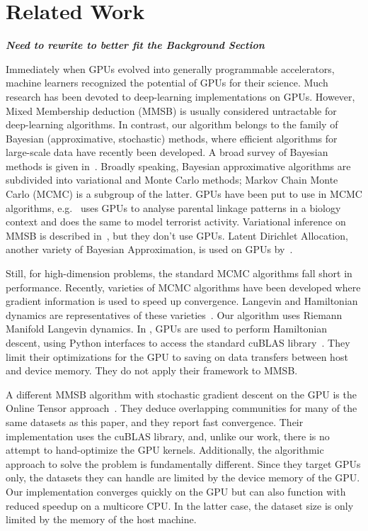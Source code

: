 \section{Related Work}
\label{sec-related}

\textbf{\textit{\large Need to rewrite to better fit the Background Section}}

Immediately when GPUs evolved into generally programmable accelerators, machine
learners recognized the potential of GPUs for their science.
Much research
has been devoted to deep-learning implementations on GPUs. However, Mixed
Membership deduction (MMSB) is usually considered untractable for deep-learning
algorithms. In contrast, our algorithm belongs to the family of Bayesian
(approximative, stochastic) methods, where efficient algorithms for large-scale
data have recently been developed. A broad survey of Bayesian methods is given
in~\cite{DBLP:journals/corr/Zhu0H14}. Broadly speaking, Bayesian approximative
algorithms are subdivided into variational and Monte Carlo methods; Markov
Chain Monte Carlo (MCMC) is a subgroup of the latter. GPUs have been put to
use in MCMC algorithms, e.g.\ \cite{journals/bioinformatics/MedlarGSBK13}
uses GPUs to analyse parental linkage patterns in a biology context and
\cite{DBLP:journals/csda/WhiteP14} does the same to model terrorist activity.
Variational inference on MMSB is described
in~\cite{DBLP:conf/nips/GopalanMGFB12}, but they don't use GPUs. Latent
Dirichlet Allocation, another variety of Bayesian Approximation, is used on
GPUs by~\cite{DBLP:conf/nips/YanXQ09}.

Still, for high-dimension problems, the standard MCMC algorithms fall short in
performance. Recently, varieties of MCMC algorithms have been developed where
gradient information is used to speed up convergence. Langevin and Hamiltonian
dynamics are representatives of these
varieties~\cite{Girolami_riemannmanifold}.  Our algorithm uses Riemann Manifold
Langevin dynamics. In \cite{beam2014fast}, GPUs are used to perform Hamiltonian
descent, using Python interfaces to access the standard cuBLAS
library~\cite{cuBLAS}. They limit their optimizations for the GPU to
saving on data transfers between host and device memory. They do not apply
their framework to MMSB.

A different MMSB algorithm with stochastic gradient descent on the GPU is
the Online Tensor approach~\cite{DBLP:journals/corr/HuangNHVA13}. They deduce
overlapping communities for many of the same datasets as this paper, and they
report fast convergence. Their implementation uses the cuBLAS
library, and, unlike our work, there is no attempt to hand-optimize the GPU
kernels. Additionally, the algorithmic approach to solve the problem is
fundamentally different.
Since they target GPUs only, the datasets they
can handle are limited by the device memory of the GPU. Our implementation converges
quickly on the GPU but can also function with reduced speedup on a multicore
CPU. In the latter case, the dataset
size is only limited by the memory of the host machine.

